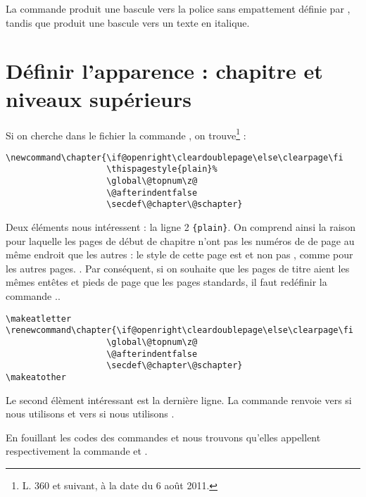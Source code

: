 La commande  produit une bascule vers la police sans empattement définie par , tandis que  produit une bascule vers un texte en italique.

\section{Définir l'apparence : chapitre et niveaux supérieurs}

Si on cherche dans le fichier  la commande , on trouve\footnote{L. 360 et suivant, à la date du 6 août 2011.} :

\begin{verbatim}
\newcommand\chapter{\if@openright\cleardoublepage\else\clearpage\fi
                    \thispagestyle{plain}%
                    \global\@topnum\z@
                    \@afterindentfalse
                    \secdef\@chapter\@schapter}
\end{verbatim}

Deux éléments nous intéressent : la ligne 2 \verb|{plain}|. On comprend ainsi la raison pour laquelle les  pages de début de chapitre n'ont pas les numéros de de page au même endroit que les autres : le style de cette page est  et non pas , comme pour les autres pages. . Par conséquent, si on souhaite que les pages de titre aient les mêmes entêtes et pieds de page que les pages standards, il faut redéfinir la commande .\label{entetechapter}.\label{chapitrepagestyle}

\begin{verbatim}
\makeatletter
\renewcommand\chapter{\if@openright\cleardoublepage\else\clearpage\fi
                    \global\@topnum\z@
                    \@afterindentfalse
                    \secdef\@chapter\@schapter}
\makeatother
\end{verbatim}

Le second élèment intéressant est la dernière ligne. La commande  renvoie vers  si nous utilisons  et vers  si nous utilisons .

En fouillant les codes des commandes  et  nous trouvons qu'elles appellent respectivement la commande  et .

